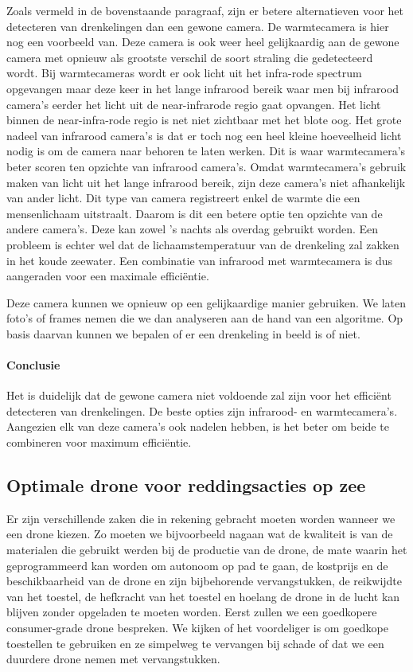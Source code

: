 Zoals vermeld in de bovenstaande paragraaf, zijn er betere alternatieven voor het detecteren van drenkelingen dan een gewone camera. De warmtecamera is hier nog een voorbeeld van. Deze camera is ook weer heel gelijkaardig aan de gewone camera met opnieuw als grootste verschil de soort straling die gedetecteerd wordt. Bij warmtecameras wordt er ook licht uit het infra-rode spectrum opgevangen maar deze keer in het lange infrarood bereik waar men bij infrarood camera's eerder het licht uit de near-infrarode regio gaat opvangen. Het licht binnen de near-infra-rode regio is net niet zichtbaar met het blote oog. Het grote nadeel van infrarood camera's is dat er toch nog een heel kleine hoeveelheid licht nodig is om de camera naar behoren te laten werken. Dit is waar warmtecamera's beter scoren ten opzichte van infrarood camera's. Omdat warmtecamera's gebruik maken van licht uit het lange infrarood bereik, zijn deze camera's niet afhankelijk van ander licht. Dit type van camera registreert enkel de warmte die een mensenlichaam uitstraalt. Daarom is dit een betere optie ten opzichte van de andere camera's. Deze kan zowel 's nachts als overdag gebruikt worden. Een probleem is echter wel dat de lichaamstemperatuur van de drenkeling zal zakken in het koude zeewater. Een combinatie van infrarood met warmtecamera is dus aangeraden voor een maximale efficiëntie.

Deze camera kunnen we opnieuw op een gelijkaardige manier gebruiken. We laten foto's of frames nemen die we dan analyseren aan de hand van een algoritme. Op basis daarvan kunnen we bepalen of er een drenkeling in beeld is of niet. 

\paragraph{Conclusie}
Het is duidelijk dat de gewone camera niet voldoende zal zijn voor het efficiënt detecteren van drenkelingen. De beste opties zijn infrarood- en warmtecamera's. Aangezien elk van deze camera's ook nadelen hebben, is het beter om beide te combineren voor maximum efficiëntie.

\subsection{Optimale drone voor reddingsacties op zee}

Er zijn verschillende zaken die in rekening gebracht moeten worden wanneer we een drone kiezen. Zo moeten we bijvoorbeeld nagaan wat de kwaliteit is van de materialen die gebruikt werden bij de productie van de drone, de mate waarin het geprogrammeerd kan worden om autonoom op pad te gaan, de kostprijs en de beschikbaarheid van de drone en zijn bijbehorende vervangstukken, de reikwijdte van het toestel, de hefkracht van het toestel en hoelang de drone in de lucht kan blijven zonder opgeladen te moeten worden. Eerst zullen we een goedkopere consumer-grade drone bespreken. We kijken of het voordeliger is om goedkope toestellen te gebruiken en ze simpelweg te vervangen bij schade of dat we een duurdere drone nemen met vervangstukken.

